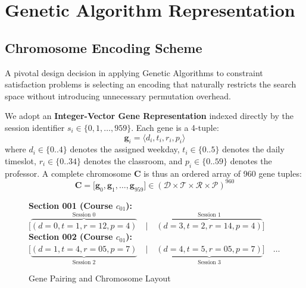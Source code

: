 \documentclass[12pt,a4paper]{report}
\begin{document}
\chapter{Genetic Algorithm Representation}

\section{Chromosome Encoding Scheme}
A pivotal design decision in applying Genetic Algorithms to constraint satisfaction problems is selecting an encoding that naturally restricts the search space without introducing unnecessary permutation overhead.

We adopt an \textbf{Integer-Vector Gene Representation} indexed directly by the session identifier $s_i \in \{0, 1, \dots, 959\}$. Each gene is a 4-tuple:
\begin{equation}
  \mathbf{g}_i = \langle d_i, t_i, r_i, p_i \rangle
\end{equation}
where $d_i \in \{0..4\}$ denotes the assigned weekday, $t_i \in \{0..5\}$ denotes the daily timeslot, $r_i \in \{0..34\}$ denotes the classroom, and $p_i \in \{0..59\}$ denotes the professor. A complete chromosome $\mathbf{C}$ is thus an ordered array of 960 gene tuples:
\begin{equation}
  \mathbf{C} = \big[ \mathbf{g}_0, \mathbf{g}_1, \dots, \mathbf{g}_{959} \big] \in (\mathcal{D} \times \mathcal{T} \times \mathcal{R} \times \mathcal{P})^{960}
\end{equation}

\begin{figure}[H]
  \centering
  \begin{tcolorbox}[colback=PrismLabel!15, colframe=PrismHeader, width=0.95\linewidth, title=Chromosome Structural Schema]
    \centering
    \small
    \textbf{Section 001 (Course $c_{01}$):} $\big[ \overbrace{(d=0, t=1, r=12, p=4)}^{\text{Session 0}} \quad \vert \quad \overbrace{(d=3, t=2, r=14, p=4)}^{\text{Session 1}} \big]$\\
    \vspace{2pt}
    \textbf{Section 002 (Course $c_{01}$):} $\big[ \underbrace{(d=1, t=4, r=05, p=7)}_{\text{Session 2}} \quad \vert \quad \underbrace{(d=4, t=5, r=05, p=7)}_{\text{Session 3}} \big] \quad \dots$
  \end{tcolorbox}
  \caption{Gene Pairing and Chromosome Layout}
  \label{fig:chromosome_schema}
\end{figure}
\end{document}
